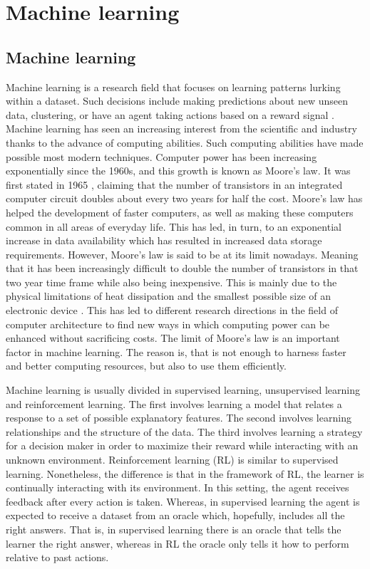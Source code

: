 
\chapter{Machine learning}
\label{ch:machine_learning}

\section{Machine learning}

Machine learning is a research field that focuses on learning patterns lurking within a dataset. Such decisions include making predictions about new unseen data, clustering, or have an agent taking actions based on a reward signal \cite{murphy2012machine, sutton1998reinforcement}. Machine learning has seen an increasing interest from the scientific and industry thanks to the advance of computing abilities. Such computing abilities have made possible most modern techniques. Computer power has been increasing exponentially since the 1960s, and this growth is known as Moore's law. It was first stated in 1965 \cite{moore2006cramming, moore1975progress}, claiming that the number of transistors in an integrated computer circuit doubles about every two years for half the cost. Moore's law has helped the development of faster computers, as well as making these computers common in all areas of everyday life. This has led, in turn, to an exponential increase in data availability which has resulted in increased data storage requirements. However, Moore's law is said to be at its limit nowadays. Meaning that it has been increasingly difficult to double the number of transistors in that two year time frame while also being inexpensive. This is mainly due to the physical limitations of heat dissipation and the smallest possible size of an electronic device \cite{kumar2018end}. This has led to different research directions in the field of computer architecture to find new ways in which computing power can be enhanced without sacrificing costs. The limit of Moore's law is an important factor in machine learning. The reason is, that is not enough to harness faster and better computing resources, but also to use them efficiently.

Machine learning is usually divided in supervised learning, unsupervised learning and reinforcement learning. The first involves learning a model that relates a response to a set of possible explanatory features. The second involves learning relationships and the structure of the data. The third involves learning a strategy for a decision maker in order to maximize their reward while interacting with an unknown environment. Reinforcement learning (RL) is similar to supervised learning. Nonetheless, the difference is that in the framework of RL, the learner is continually interacting with its environment. In this setting, the agent receives feedback after every action is taken. Whereas, in supervised learning the agent is expected to  receive a dataset from an oracle which, hopefully, includes all the right answers. That is, in supervised learning there is an oracle that tells the learner the right answer, whereas in RL the oracle only tells it how to perform relative to past actions.

